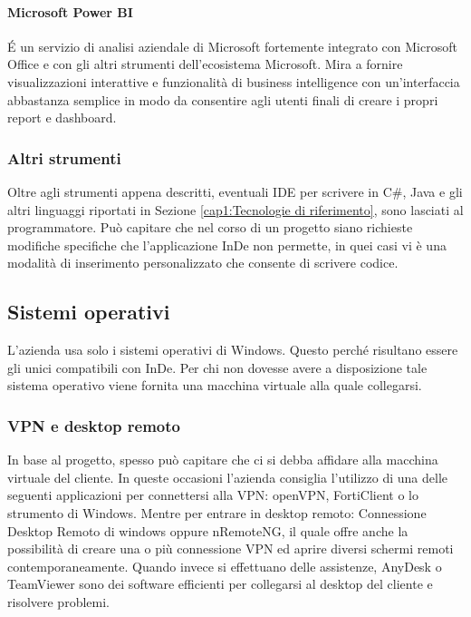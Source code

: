 \paragraph{Microsoft Power BI}
\'E un servizio di analisi aziendale di Microsoft fortemente integrato con Microsoft Office e con gli altri strumenti dell'ecosistema Microsoft. Mira a fornire visualizzazioni interattive e funzionalità di business intelligence con un'interfaccia abbastanza semplice in modo da consentire agli utenti finali di creare i propri report e dashboard.

\subsubsection*{Altri strumenti}
Oltre agli strumenti appena descritti, eventuali IDE per scrivere in C\#, Java e gli altri linguaggi riportati in Sezione \ref{cap1:Tecnologie di riferimento}, sono lasciati al programmatore. Può capitare che nel corso di un progetto siano richieste  modifiche specifiche che l'applicazione InDe non permette, in quei casi vi è una modalità di inserimento personalizzato che consente di scrivere codice.



\subsection{Sistemi operativi}
\label{cap1:Sistemi operativi}

L'azienda usa  solo i sistemi operativi di Windows. Questo perché risultano essere gli unici compatibili con InDe. Per chi non dovesse avere a disposizione tale sistema operativo viene fornita una macchina virtuale alla quale collegarsi. 

\subsubsection*{VPN e desktop remoto}
In base al progetto, spesso può capitare che ci si debba affidare alla macchina virtuale del cliente. In queste occasioni l'azienda consiglia l'utilizzo di una delle seguenti applicazioni per connettersi alla VPN: openVPN, FortiClient o lo strumento di Windows. 
Mentre per entrare in desktop remoto: Connessione Desktop Remoto di windows oppure nRemoteNG, il quale offre anche la possibilità di creare una o più connessione VPN ed aprire diversi schermi remoti contemporaneamente. 
Quando invece si effettuano delle assistenze, AnyDesk o TeamViewer sono dei software efficienti per collegarsi al desktop del cliente e risolvere problemi.


